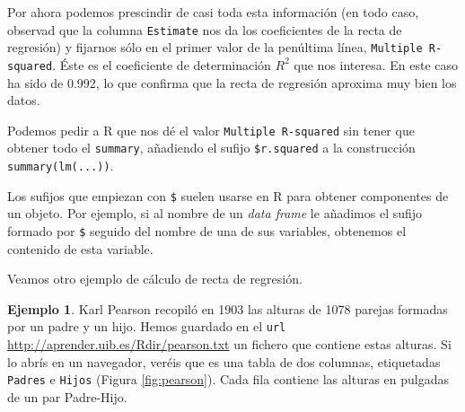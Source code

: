 \documentclass[
]{book}
\newenvironment{Shaded}{\begin{snugshade}}{\end{snugshade}}
\newcommand{\CommentTok}[1]{\textcolor[rgb]{0.56,0.35,0.01}{\textit{#1}}}
\newcommand{\DataTypeTok}[1]{\textcolor[rgb]{0.13,0.29,0.53}{#1}}
\newcommand{\KeywordTok}[1]{\textcolor[rgb]{0.13,0.29,0.53}{\textbf{#1}}}
\newcommand{\NormalTok}[1]{#1}
\newcommand{\OperatorTok}[1]{\textcolor[rgb]{0.81,0.36,0.00}{\textbf{#1}}}
\theoremstyle{definition}
\theoremstyle{definition}
\newtheorem{example}{Ejemplo}[chapter]
\theoremstyle{definition}
\theoremstyle{remark}
\begin{document}
Por ahora podemos prescindir de casi toda esta información (en todo caso, observad que la columna \texttt{Estimate} nos da los coeficientes de la recta de regresión) y fijarnos sólo en el primer valor de la penúltima línea, \texttt{Multiple\ R-squared}. Éste es el coeficiente de determinación \(R^2\) que nos interesa. En este caso ha sido de 0.992, lo que confirma que la recta de regresión aproxima muy bien los datos.

Podemos pedir a R que nos dé el valor \texttt{Multiple\ R-squared} sin tener que obtener todo el \texttt{summary}, añadiendo el sufijo \texttt{\$r.squared} a la construcción \texttt{summary(lm(...))}.

\begin{Shaded}
\end{Shaded}

Los sufijos que empiezan con \texttt{\$} suelen usarse en R para obtener componentes de un objeto. Por ejemplo, si al nombre de un \emph{data frame} le añadimos el sufijo formado por \texttt{\$} seguido del nombre de una de sus variables, obtenemos el contenido de esta variable.

\begin{Shaded}
\end{Shaded}

Veamos otro ejemplo de cálculo de recta de regresión.

\begin{example}
\protect\hypertarget{exm:reg2}{}{\label{exm:reg2} }Karl Pearson recopiló en 1903 las alturas de 1078 parejas formadas por un padre y un hijo. Hemos guardado en el \texttt{url} \url{http://aprender.uib.es/Rdir/pearson.txt} un fichero que contiene estas alturas.
Si lo abrís en un navegador, veréis que es una tabla de dos columnas, etiquetadas \texttt{Padres} e \texttt{Hijos} (Figura \ref{fig:pearson}). Cada fila contiene las alturas en pulgadas de un par Padre-Hijo.
\end{example}
\end{document}
